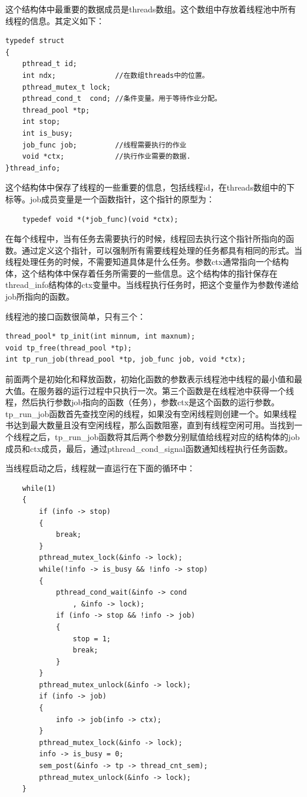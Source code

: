 \documentclass[twoside, xetex]{report}
\begin{document}
	这个结构体中最重要的数据成员是threads数组。这个数组中存放着线程池中所有线程的信息。其定义如下：
\begin{verbatim}	
typedef struct 
{
	pthread_t id; 
	int ndx;              //在数组threads中的位置。
	pthread_mutex_t lock; 
	pthread_cond_t  cond; //条件变量。用于等待作业分配。
	thread_pool *tp;
	int stop;
	int is_busy;
	job_func job;         //线程需要执行的作业
	void *ctx;            //执行作业需要的数据.
}thread_info;
\end{verbatim}

	这个结构体中保存了线程的一些重要的信息，包括线程id，在threads数组中的下标等。job成员变量是一个函数指针，这个指针的原型为：
\begin{verbatim}
	typedef void *(*job_func)(void *ctx); 
\end{verbatim}

	在每个线程中，当有任务去需要执行的时候，线程回去执行这个指针所指向的函数。通过定义这个指针，可以强制所有需要线程处理的任务都具有相同的形式。当线程处理任务的时候，不需要知道具体是什么任务。参数ctx通常指向一个结构体，这个结构体中保存着任务所需要的一些信息。这个结构体的指针保存在thread\_info结构体的ctx变量中。当线程执行任务时，把这个变量作为参数传递给job所指向的函数。
	
	线程池的接口函数很简单，只有三个：
\begin{verbatim}
thread_pool* tp_init(int minnum, int maxnum);
void tp_free(thread_pool *tp);
int tp_run_job(thread_pool *tp, job_func job, void *ctx);
\end{verbatim}

	前面两个是初始化和释放函数，初始化函数的参数表示线程池中线程的最小值和最大值。在服务器的运行过程中只执行一次。第三个函数是在线程池中获得一个线程，然后执行参数job指向的函数（任务），参数ctx是这个函数的运行参数。tp\_run\_job函数首先查找空闲的线程，如果没有空闲线程则创建一个。如果线程书达到最大数量且没有空闲线程，那么函数阻塞，直到有线程空闲可用。当找到一个线程之后，tp\_run\_job函数将其后两个参数分别赋值给线程对应的结构体的job成员和ctx成员，最后，通过pthread\_cond\_signal函数通知线程执行任务函数。
	
	当线程启动之后，线程就一直运行在下面的循环中：
\begin{verbatim}
	while(1)
	{
		if (info -> stop)
		{
			break;
		}
		pthread_mutex_lock(&info -> lock);
		while(!info -> is_busy && !info -> stop)
		{
			pthread_cond_wait(&info -> cond
				, &info -> lock);
			if (info -> stop && !info -> job)
			{
				stop = 1;
				break;
			}
		}
		pthread_mutex_unlock(&info -> lock);
		if (info -> job)
		{
			info -> job(info -> ctx);
		}
		pthread_mutex_lock(&info -> lock);
		info -> is_busy = 0;
		sem_post(&info -> tp -> thread_cnt_sem);
		pthread_mutex_unlock(&info -> lock);
	}
\end{verbatim}
\end{document}
